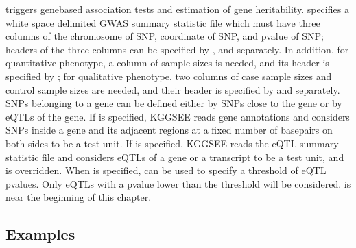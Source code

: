 \documentclass[letterpaper,10pt,english,openany,oneside]{sphinxmanual}
\begin{document}
\sphinxAtStartPar
{} triggers gene\sphinxhyphen{}based association tests and estimation of gene heritability.  specifies a white space delimited GWAS summary statistic file which must have three columns of the chromosome of SNP, coordinate of SNP, and p\sphinxhyphen{}value of SNP; headers of the three columns can be specified by ,  and  separately. In addition, for quantitative phenotype, a column of sample sizes is needed, and its header is specified by ; for qualitative phenotype, two columns of case sample sizes and control sample sizes are needed, and their header is specified by  and  separately. SNPs belonging to a gene can be defined either by SNPs close to the gene or by eQTLs of the gene. If  is specified, KGGSEE reads gene annotations and considers SNPs inside a gene and its adjacent regions at a fixed number of basepairs on both sides to be a test unit. If  is specified, KGGSEE reads the eQTL summary statistic file and considers eQTLs of a gene or a transcript to be a test unit, and  is overridden. When  is specified,  can be used to specify a threshold of eQTL p\sphinxhyphen{}values. Only eQTLs with a p\sphinxhyphen{}value lower than the threshold will be considered. {\hyperref[\detokenize{detailed_document:eqtl-file}]{}} is near the beginning of this chapter.


\subsection{Examples}
\label{\detokenize{detailed_document:id10}}
\end{document}
